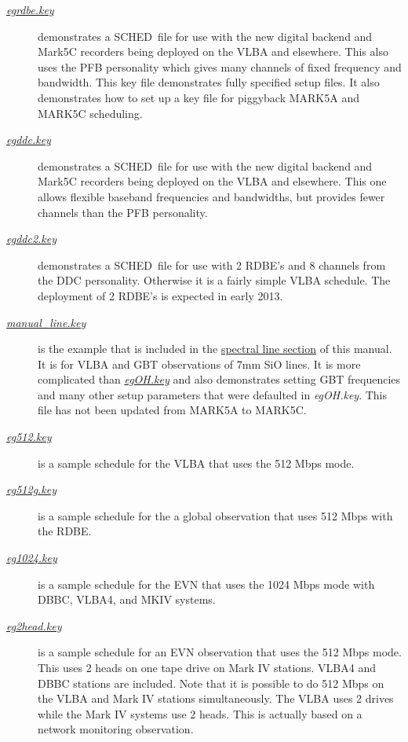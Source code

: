 \documentclass{report}
\newcommand{\schedb}{{\sc SCHED~}}
\begin{document}
\begin{description}
\item[
{\href{examples/egrdbe.key}{{\sl egrdbe.key}}}]
demonstrates a \schedb file for use with the new digital backend and
Mark5C recorders being deployed on the VLBA and elsewhere.  This also
uses the PFB personality which gives many channels of fixed frequency
and bandwidth.  This key file demonstrates fully specified setup
files.  It also demonstrates how to set up a key file for piggyback
MARK5A and MARK5C scheduling.

\item[
{\href{examples/egddc.key}{{\sl egddc.key}}}]
demonstrates a \schedb file for use with the new digital backend
and Mark5C recorders being deployed on the VLBA and elsewhere.
This one allows flexible baseband frequencies and bandwidths, but provides
fewer channels than the PFB personality.

\item[
{\href{examples/egddc2.key}{{\sl egddc2.key}}}]
demonstrates a \schedb file for use with 2 RDBE's and 8 channels
from the DDC personality.  Otherwise it is a fairly simple VLBA
schedule.  The deployment of 2 RDBE's is expected in early 2013.

\item[
{\href{examples/manual\_line.key}{{\sl manual\_line.key}}}]
is the example that is included in the 
{\hyperref[SEC:LINE]{spectral line section}} of this
manual.  It is for VLBA and GBT observations of 7mm SiO lines.  It
is more complicated than 
{\href{examples/egOH.key}{{\sl egOH.key}}}
and also demonstrates setting GBT
frequencies and many other setup parameters that were defaulted
in {\sl egOH.key}.  This file has not been updated from MARK5A to 
MARK5C.

\item[
{\href{examples/eg512.key}{{\sl eg512.key}}}] is a
sample schedule for the VLBA that uses the 512 Mbps mode.

\item[
{\href{examples/eg512g.key}{{\sl eg512g.key}}}] is a
sample schedule for the a global observation that uses 512 Mbps with
the RDBE.

\item[
{\href{examples/eg1024.key}{{\sl eg1024.key}}}] is a
sample schedule for the EVN that uses the 1024 Mbps mode with DBBC,
VLBA4, and MKIV systems.

\item[
{\href{examples/eg2head.key}{{\sl eg2head.key}}}] is
a sample schedule for an EVN observation that uses the 512 Mbps mode.
This uses 2 heads on one tape drive on Mark IV stations.  VLBA4 and
DBBC stations are included.  Note that it is possible to do 512 Mbps
on the VLBA and Mark IV stations simultaneously.  The VLBA uses 2
drives while the Mark IV systems use 2 heads.  This is actually based
on a network monitoring observation.


\end{description}
\end{document}
